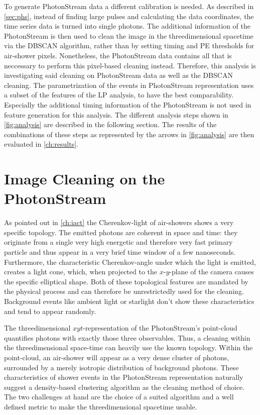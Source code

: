 %
To generate PhotonStream data a different calibration is needed. As described
in \autoref{sec:phs}, instead of finding large pulses and calculating the data
coordinates, the time series data is turned into single photons. The additional
information of the PhotonStream is then used to clean the image in the
threedimensional spacetime via the DBSCAN algorithm, rather than by setting
timing and PE thresholds for air-shower pixels. Nonetheless, the PhotonStream
data contains all that is neccessary to perform this pixel-based cleaning
instead. Therefore, this analysis is investigating said cleaning on
PhotonStream data as well as the DBSCAN cleaning. The parametrization of the
events in PhotonStream representation uses a subset of the features of the LP
analysis, to have the best comparability. Especially the additional timing
information of the PhotonStream is not used in feature generation for this
analysis. The different analysis steps shown in \autoref{fig:analysis} are
described in the following section. The results of the combinations of these
steps as represented by the arrows in \autoref{fig:analysis} are then evaluated
in \autoref{ch:results}.

\section{Image Cleaning on the PhotonStream}\label{sec:phs_clean}
%
As pointed out in \autoref{ch:iact} the Cherenkov-light of air-showers shows a
very specific topology. The emitted photons are coherent in space and time:
they originate from a single very high energetic and therefore very fast
primary particle and thus appear in a very brief time window of a few
nanoseconds. Furthermore, the characteristic Cherenkov-angle under which the
light is emitted, creates a light cone, which, when projected to the
$x$-$y$-plane of the camera causes the specific elliptical shape. Both of these
topological features are mandated by the physical process and can therefore be
unrestrictedly used for the cleaning. Background events like ambient light or
starlight don't show these characteristics and tend to appear randomly.

The threedimensional $xyt$-representation of the PhotonStream's point-cloud
quantifies photons with exactly those three observables. Thus, a cleaning
within the threedimensional space-time can heavily use the known topology.
Within the point-cloud, an air-shower will appear as a very dense cluster of
photons, surrounded by a merely isotropic distribution of background photons.
These characteristics of shower events in the PhotonStream representation
naturally suggest a density-based clustering algorithm as the cleaning method
of choice. The two challenges at hand are the choice of a suited algorithm and
a well defined metric to make the threedimensional spacetime usable.

